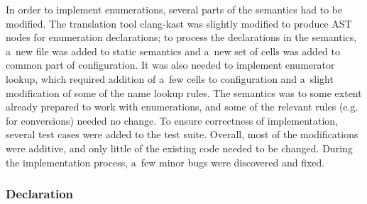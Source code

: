 \documentclass{fithesis3}
\begin{document}



In order to implement enumerations, several parts of the semantics had to be modified. The translation tool clang-kast was slightly modified to produce AST nodes for enumeration declarations; to process the declarations in the semantics, a~new file was added to static semantics and a~new set of cells was added to common part of configuration. It was also needed to implement enumerator lookup, which required addition of a~few cells to configuration and a~slight modification of some of the name lookup rules. The semantics was to some extent already prepared to work with enumerations, and some of the relevant rules (e.g. for conversions) needed no change. To ensure correctness of implementation, several test cases were added to the test suite. Overall, most of the modifications were additive, and only little of the existing code needed to be changed. During the implementation process, a~few minor bugs were discovered and fixed. 


\subsubsection{Declaration}
\end{document}
